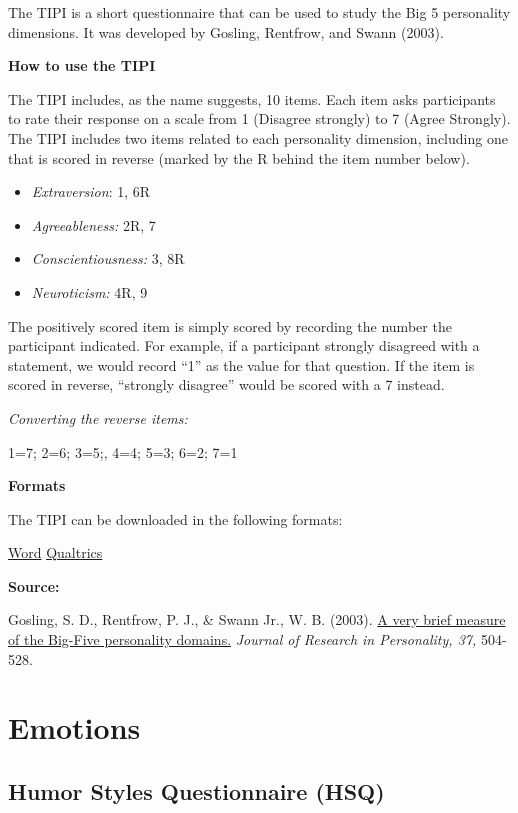 \documentclass[
]{book}
\providecommand{\tightlist}{%
  \setlength{\itemsep}{0pt}\setlength{\parskip}{0pt}}
\begin{document}
The TIPI is a short questionnaire that can be used to study the Big 5 personality dimensions. It was developed by Gosling, Rentfrow, and Swann (2003).

\textbf{How to use the TIPI}

The TIPI includes, as the name suggests, 10 items. Each item asks participants to rate their response on a scale from 1 (Disagree strongly) to 7 (Agree Strongly). The TIPI includes two items related to each personality dimension, including one that is scored in reverse (marked by the R behind the item number below).

\begin{itemize}
\tightlist
\item
  \emph{Extraversion}: 1, 6R
\item
  \emph{Agreeableness:} 2R, 7
\item
  \emph{Conscientiousness:} 3, 8R
\item
  \emph{Neuroticism:} 4R, 9
\end{itemize}

The positively scored item is simply scored by recording the number the participant indicated. For example, if a participant strongly disagreed with a statement, we would record ``1'' as the value for that question. If the item is scored in reverse, ``strongly disagree'' would be scored with a 7 instead.

\emph{Converting the reverse items:}

1=7; 2=6; 3=5;, 4=4; 5=3; 6=2; 7=1

\textbf{Formats}

The TIPI can be downloaded in the following formats:

\href{link\%20to\%20file}{Word} \textbar{} \href{link\%20to\%20file}{Qualtrics}

\textbf{Source:}

Gosling, S. D., Rentfrow, P. J., \& Swann Jr., W. B. (2003). \href{http://citeseerx.ist.psu.edu/viewdoc/download?doi=10.1.1.113.6704\&rep=rep1\&type=pdf}{A very brief measure of the Big-Five personality domains.} \emph{Journal of Research in Personality, 37,} 504-528.

\hypertarget{emotions}{%
\section{Emotions}\label{emotions}}

\hypertarget{humor-styles-questionnaire-hsq}{%
\subsection{Humor Styles Questionnaire (HSQ)}\label{humor-styles-questionnaire-hsq}}
\end{document}
